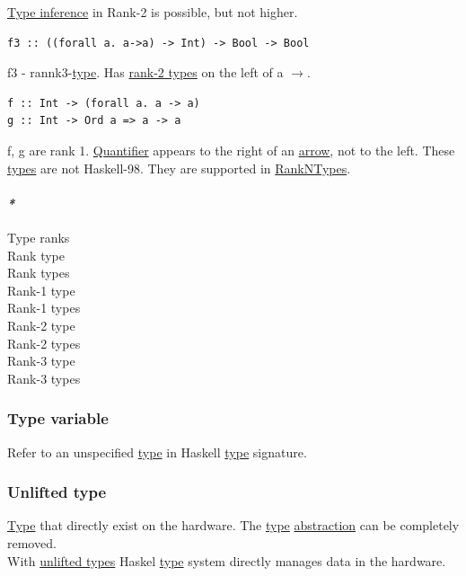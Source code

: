 \documentclass[11pt]{article}
\begin{document}
\hyperref[orgf4f2545]{Type inference} in Rank-2 is possible, but not higher.\\

\begin{verbatim}
f3 :: ((forall a. a->a) -> Int) -> Bool -> Bool
\end{verbatim}
f3 - rannk3-\hyperref[org4fbaeb8]{type}. Has \hyperref[org24f0bf7]{rank-2 types} on the left of a \(\to\).\\

\begin{verbatim}
f :: Int -> (forall a. a -> a)
g :: Int -> Ord a => a -> a
\end{verbatim}
f, g are rank 1. \hyperref[org7158dde]{Quantifier} appears to the right of an \hyperref[org5b6e6e9]{arrow}, not to the left. These \hyperref[org3927fd9]{types} are not Haskell-98. They are supported in \hyperref[org52ee511]{RankNTypes}.\\


\paragraph{\emph{*}}
\label{sec:org0b3b4ce}

\label{orgcef1927}Type ranks\\
\label{org541aa84}Rank type\\
\label{orgf1fa4f1}Rank types\\
\label{org108fd7d}Rank-1 type\\
\label{orgb8084b9}Rank-1 types\\
\label{orge784660}Rank-2 type\\
\label{org24f0bf7}Rank-2 types\\
\label{org780d20a}Rank-3 type\\
\label{org7b532b4}Rank-3 types\\

\subsubsection{\label{orgd6d755f}Type variable}
\label{sec:orgad65d4a}
Refer to an unspecified \hyperref[org4fbaeb8]{type} in Haskell \hyperref[org4fbaeb8]{type} signature.\\

\subsubsection{\label{orgd6e876a}Unlifted type}
\label{sec:org6e3c48b}
\hyperref[org4fbaeb8]{Type} that directly exist on the hardware. The \hyperref[org4fbaeb8]{type} \hyperref[orgd787547]{abstraction} can be completely removed.\\
With \hyperref[orgb49b699]{unlifted types} Haskel \hyperref[org4fbaeb8]{type} system directly manages data in the hardware.\\
\end{document}
